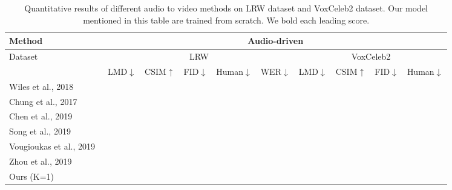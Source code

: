 \documentclass[runningheads]{llncs}
\begin{document}
 
\begin{table}[t]
\scriptsize
    \centering
\begin{tabular*}{\linewidth}{  l| c c c c c |c c c c}
      \toprule
Method  & \multicolumn{9}{c}{Audio-driven}  \\ \hline
Dataset & \multicolumn{5}{c}{LRW} & \multicolumn{4}{c}{VoxCeleb2}  \\
      \midrule
& {LMD$\downarrow$} & {CSIM$\uparrow$} & {FID$\downarrow$} & {Human$\downarrow$} & {WER$\downarrow$} & {LMD$\downarrow$} & {CSIM$\uparrow$} & {FID$\downarrow$} & {Human$\downarrow$}  \\

\hline
{Wiles et al., 2018~\cite{wiles2018x2face}} &  &    &   & &    &    &  \\
 {Chung et al., 2017~\cite{chung2017you}}&  &       &  & &   &    &     \\ %

 {Chen et al., 2019~\cite{chen2019hierarchical}}  &   &   &   &  &   &   &  \\    %
  {Song et al., 2019~\cite{ijcai2019-129}}  & \textbf{ } &   &   & & \textbf{ }   &  &  \\    %
  {Vougioukas et al., 2019~\cite{vougioukas2019realistic}}  &   &   &   &  &     &        &  \\   

  {Zhou et al., 2019~\cite{zhou2019talking}}  &   &   &   &  &     &        &  \\   
    \bottomrule
  { Ours (K=1)} &   & \textbf{  }& \textbf{   }&  &   &\textbf{      } &\textbf{      }\\ %
  \end{tabular*}
  \caption{Quantitative results of different audio to video methods on LRW dataset and VoxCeleb2 dataset. Our model mentioned in this table are trained from scratch. We bold each leading score.}
    \label{tab:audio_tb}
\end{table}
\end{document}
